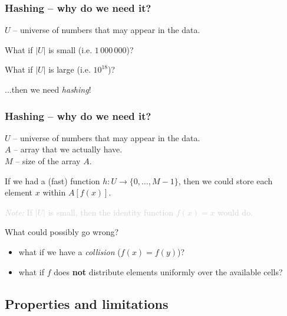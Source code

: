 \documentclass{beamer}
\begin{document}
\begin{frame}
    \frametitle{Hashing -- why do we need it?}

    \pause
    \begin{block}{}
    $U$ -- universe of numbers that may appear in the data.
    \end{block}

    What if $|U|$ is small (i.e. $1\,000\,000$)? \pause

    \medskip
    What if $|U|$ is large (i.e. $10^{18}$)? \pause

    \medskip
    ...then we need \textit{hashing}!
\end{frame}

\begin{frame}
    \frametitle{Hashing -- why do we need it?}
    \begin{block}{}
    $U$ -- universe of numbers that may appear in the data. \\
    $A$ -- array that we actually have. \\
    $M$ -- size of the array $A$.
    \end{block}

    \pause
    If we had a (fast) function $h : U \rightarrow \{0, \dots, M-1\}$, then we
    could store each element $x$ within $A[f(x)]$.

    \pause
    \textcolor{lightgray}{
    \textit{Note:} If $|U|$ is small, then the identity function $f(x) = x$
    would do.}

    \pause
    What could possibly go wrong? \pause
    \begin{itemize}
        \item what if we have a \textit{collision} ($f(x) = f(y)$)? \pause
        \item what if $f$ does \textbf{not} distribute elements uniformly over
            the available cells?
    \end{itemize}

\end{frame}

\subsection{Properties and limitations}
\end{document}
